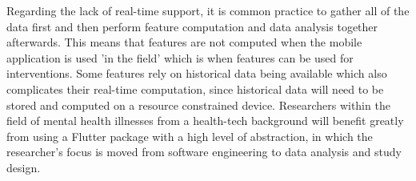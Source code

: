 Regarding the lack of real-time support, it is common practice to gather all of the data first and then perform feature computation and data analysis together afterwards. This means that features are not computed when the mobile application is used 'in the field' which is when features can be used for interventions. Some features rely on historical data being available which also complicates their real-time computation, since historical data will need to be stored and computed on a resource constrained device. Researchers within the field of mental health illnesses from a health-tech background will benefit greatly from using a Flutter package with a high level of abstraction, in which the researcher's focus is moved from software engineering to data analysis and study design. 